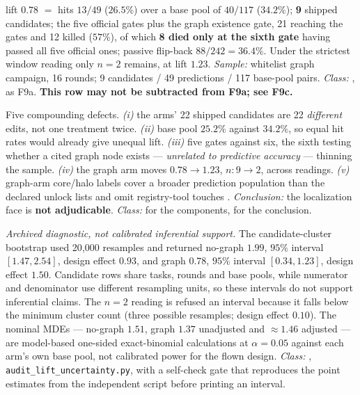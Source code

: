 \begin{description}[leftmargin=0pt,labelindent=0pt,labelsep=0pt,style=nextline,font=\normalfont,itemsep=6pt]
\item[\textbf{F9b}\quad Localization lift, graph arm.]
lift $\mathbf{0.78}$ $=$ hits $13/49$ ($26.5\%$) over a base pool of
$40/117$ ($34.2\%$); \textbf{9} shipped candidates; the five official gates
plus the graph existence gate, 21 reaching the gates and 12 killed
($57\%$), of which \textbf{8 died only at the sixth gate} having passed all
five official ones; passive flip-back $88/242 = 36.4\%$. Under the
strictest window reading only $n=2$ remains, at lift $1.23$.
\emph{Sample:} whitelist graph campaign, 16 rounds; 9 candidates / 49
predictions / 117 base-pool pairs. \emph{Class:} , as F9a.
\textbf{This row may not be subtracted from F9a; see F9c.}

\item[\textbf{F9c}\quad Why F9a and F9b are not an arm comparison.]
Five compounding defects. \emph{(i)} the arms' 22 shipped candidates are
22 \emph{different} edits, not one treatment twice. \emph{(ii)} base
pool $25.2\%$ against $34.2\%$, so equal hit rates would already give
unequal lift. \emph{(iii)} five gates against six, the sixth testing
whether a cited graph node exists --- \emph{unrelated to predictive
accuracy} --- thinning the sample. \emph{(iv)} the graph arm moves
$0.78 \to 1.23$, $n: 9 \to 2$, across readings. \emph{(v)} graph-arm core/halo labels cover a broader prediction
population than the declared unlock lists and omit registry-tool touches
. \emph{Conclusion:} the localization face is
\textbf{not adjudicable}. \emph{Class:}  for the components,
 for the conclusion.

\item[\textbf{F9d}\quad Uncertainty on the lift estimates.]
\emph{Archived diagnostic, not calibrated inferential support.} The
candidate-cluster bootstrap used 20{,}000 resamples and returned no-graph
$1.99$, $95\%$ interval $[1.47, 2.54]$, design effect $0.93$, and graph
$0.78$, $95\%$ interval $[0.34, 1.23]$, design effect $1.50$. Candidate rows
share tasks, rounds and base pools, while numerator and denominator use
different resampling units, so these intervals do not support inferential
claims. The $n=2$ reading is refused an interval because it falls below the
minimum cluster count (three possible resamples; design effect $0.10$). The
nominal MDEs --- no-graph $1.51$, graph $1.37$ unadjusted and $\approx 1.46$
adjusted --- are model-based one-sided exact-binomial calculations at
$\alpha=0.05$ against each arm's own base pool, not calibrated power for
the flown design. \emph{Class:} ,
\texttt{audit\_lift\_uncertainty.py}, with a self-check gate that
reproduces the point estimates from the independent script before printing
an interval.


\end{description}
